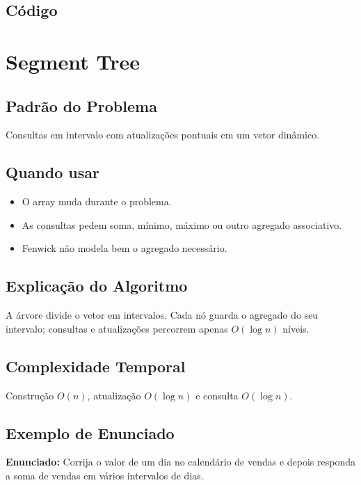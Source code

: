\subsection{Código}

\section{Segment Tree}

\subsection{Padrão do Problema}
Consultas em intervalo com atualizações pontuais em um vetor dinâmico.

\subsection{Quando usar}
\begin{itemize}[nosep]
  \item O array muda durante o problema.
  \item As consultas pedem soma, mínimo, máximo ou outro agregado associativo.
  \item Fenwick não modela bem o agregado necessário.
\end{itemize}

\subsection{Explicação do Algoritmo}
A árvore divide o vetor em intervalos. Cada nó guarda o agregado do seu intervalo; consultas e atualizações percorrem apenas $O(\log n)$ níveis.

\subsection{Complexidade Temporal}
Construção $O(n)$, atualização $O(\log n)$ e consulta $O(\log n)$.

\subsection{Exemplo de Enunciado}
\begin{exemplodiabox}
\textbf{Enunciado:} Corrija o valor de um dia no calendário de vendas e depois responda a soma de vendas em vários intervalos de dias.
\end{exemplodiabox}

